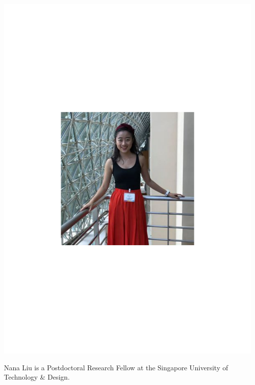 \includegraphics[width=\columnwidth]{photo_nana_liu}

Nana Liu is a Postdoctoral Research Fellow at the Singapore University of Technology \& Design.


